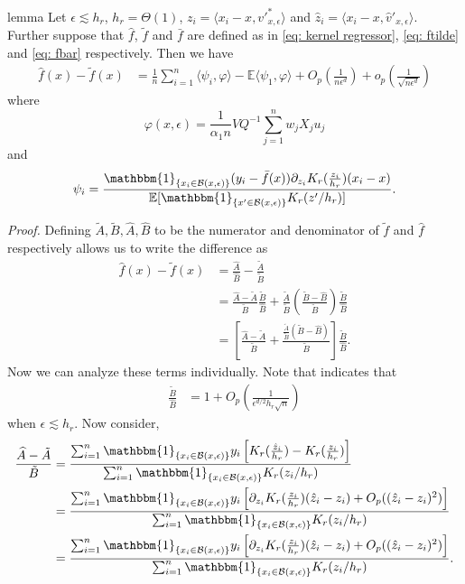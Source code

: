 \documentclass[11pt]{article}
\begin{document}
\begin{restatable}{lemma}{}\label{lemma: fhat minus ftilde}
    Let $\epsilon \lesssim h_r$, $h_r = \Theta(1)$, $z_i = \langle x_i - x, v'^*_{x, \epsilon}\rangle$ and $\hat{z}_i = \langle x_i - x, \hat{v}'_{x, \epsilon}\rangle$. Further suppose that $\hat{f}$, $\tilde{f}$ and $\bar{f}$ are defined as in \cref{eq: kernel regressor}, \cref{eq: ftilde} and \cref{eq: fbar} respectively. Then we have
    \begin{align}
        \hat{f}(x) - \tilde{f}(x) &= \frac{1}{n}\sum_{i = 1}^n\langle\psi_i, \varphi\rangle - \mathbb{E}\langle\psi_1, \varphi\rangle + O_p\left(\frac{1}{n\epsilon^{d}}\right) + o_p\left(\frac{1}{\sqrt{n\epsilon^d}}\right)
    \end{align}
    where 
    \[\varphi(x, \epsilon) = \frac{1}{\alpha_1n}VQ^{-1}\sum_{j = 1}^nw_jX_ju_j\]
    and
    \[\psi_i = \frac{\mathbbm{1}_{\{x_i \in \mathcal{B}(x, \epsilon)\}}(y_i - \bar{f}(x))\partial_{z_i}K_r(\frac{z_i}{h_r})(x_i - x)}{\mathbb{E}[\mathbbm{1}_{\{x' \in \mathcal{B}(x, \epsilon)\}}K_r(z'/h_r)]}.\]
\end{restatable}
\noindent \textit{Proof.} 
Defining $\tilde{A}, \tilde{B}, \widehat{A}, \widehat{B}$ to be the numerator and denominator of $\tilde{f}$ and $\hat{f}$ respectively allows us to write the difference as
\begin{align}
    \hat{f}(x) - \tilde{f}(x)  &= \frac{\widehat{A}}{\widehat{B}} - \frac{\tilde{A}}{\tilde{B}} \\
    &= \frac{\widehat{A}-\tilde{A}}{\tilde{B}}\frac{\tilde{B}}{\widehat{B}} + \frac{\tilde{A}}{\tilde{B}}\left(\frac{\tilde{B} - \widehat{B}}{\tilde{B}}\right)\frac{\tilde{B}}{\widehat{B}} \\
    &= 
    \left[\frac{\widehat{A}-\tilde{A}}{\tilde{B}} + \frac{\frac{\tilde{A}}{\tilde{B}}\left(\tilde{B} - \widehat{B}\right)}{\tilde{B}}\right]\frac{\tilde{B}}{\widehat{B}}. \label{eq: kdr estimator decomp}
\end{align}
Now we can analyze these terms individually. Note that  indicates that
\begin{align*}
    \frac{\tilde{B}}{\widehat{B}} &= 1  + O_p\left(\frac{1}{\epsilon^{d/2}h_r\sqrt{n}}\right)
\end{align*}
when $\epsilon \lesssim h_r$. Now consider,
\begin{align}
    \frac{\widehat{A} - \tilde{A}}{\tilde{B}} &= \frac{\sum_{i=1}^n\mathbbm{1}_{\{x_i \in \mathcal{B}(x, \epsilon)\}}y_i\left[K_r(\frac{\hat{z}_i}{h_r}) - K_r(\frac{z_i}{h_r})\right]}{\sum_{i = 1}^n\mathbbm{1}_{\{x_i \in \mathcal{B}(x, \epsilon)\}}K_r(z_i/h_r)} \\
    &= \frac{\sum_{i=1}^n\mathbbm{1}_{\{x_i \in \mathcal{B}(x, \epsilon)\}}y_i\left[\partial_{z_i}K_r(\frac{z_i}{h_r})(\hat{z}_i - z_i) + O_p((\hat{z}_i - z_i)^2)\right]}{\sum_{i = 1}^n\mathbbm{1}_{\{x_i \in \mathcal{B}(x, \epsilon)\}}K_r(z_i/h_r)} \\
    &= \frac{\sum_{i=1}^n\mathbbm{1}_{\{x_i \in \mathcal{B}(x, \epsilon)\}}y_i\left[\partial_{z_i}K_r(\frac{z_i}{h_r})(\hat{z}_i - z_i) + O_p((\hat{z}_i - z_i)^2)\right]}{\sum_{i = 1}^n\mathbbm{1}_{\{x_i \in \mathcal{B}(x, \epsilon)\}}K_r(z_i/h_r)}.
\end{align}
\end{document}
